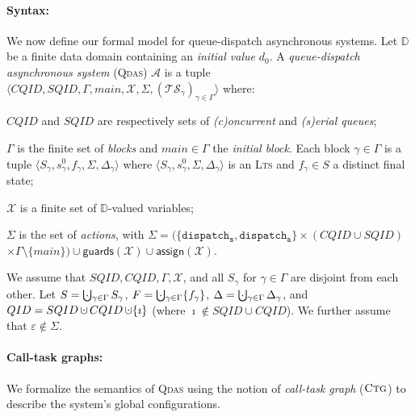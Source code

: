 \documentclass[runningheads,oribibl,]{article}
\newcommand{\tuple}[1]{\langle#1\rangle\xspace}
\newcommand{\Aa}{\ensuremath{\mathcal{A}}\xspace}
\newcommand{\Ts}{\ensuremath{\mathcal{TS}}\xspace}
\newcommand{\Xx}{\ensuremath{\mathcal{X}}\xspace}
\newcommand{\e}{\ensuremath{\varepsilon}\xspace}
\newcommand{\DD}{\ensuremath{\mathbb{D}}\xspace}
\newcommand{\cfont}[1]{\ensuremath{\mathtt{#1}}\xspace}
\DeclareMathOperator{\dotcup}{\mathaccent\cdot\cup}
\DeclareMathOperator{\bigdotcup}{\ooalign{$\bigcup$\cr\hfill$\cdot$\hfill}}
\newcommand{\CQID}{CQID\xspace}
\newcommand{\SQID}{SQID\xspace}
\newcommand{\QID}{QID\xspace}
\newcommand{\lts}{\textsc{Lts}\xspace}
\newcommand{\qdas}{\textsc{Qdas}\xspace}
\newcommand{\ctg}{\ensuremath{\textsc{Ctg}}\xspace}
\newcommand{\disps}{\ensuremath{\cfont{dispatch_s}}}
\newcommand{\dispa}{\ensuremath{\cfont{dispatch_a}}}
\newcommand{\guardson}[1]{\ensuremath{\mathsf{guards}\left(#1\right)}}
\newcommand{\assignon}[1]{\ensuremath{\mathsf{assign}\left(#1\right)}}
\newenvironment{myitemize}{\begin{list}{\labelitemi}{\setlength{\topsep}{4pt}\setlength{\partopsep}{0pt}
\setlength{\itemsep}{0pt}
\setlength{\itemindent}{0ex}
\setlength{\listparindent}{0ex}
\setlength{\leftmargin}{4ex}\setlength{\labelwidth}{2ex}
}}
{\end{list}}
\begin{document}
\paragraph{\bf Syntax:} We now define our formal model for
queue-dispatch asynchronous systems.
Let $\DD$ be a finite data domain containing an \emph{initial value}
$d_0$. A \emph{queue-dispatch asynchronous system} (\qdas) $\Aa$ is
a tuple $\tuple{ \CQID, \SQID, \Gamma, main, \Xx, \Sigma,
  (\Ts_\gamma)_{\gamma\in\Gamma}}$ where:
\begin{myitemize}
  \item $\CQID$ and $\SQID$ are respectively sets of
    \emph{(c)oncurrent} and \emph{(s)erial queues};
  \item $\Gamma$ is the finite set of \emph{blocks} and
    $main\in\Gamma$ the \emph{initial block}.  Each block
    $\gamma\in\Gamma$ is a tuple $\langle S_\gamma, s^0_\gamma,
    f_\gamma, \Sigma, \Delta_\gamma \rangle$ where $\langle S_\gamma,
    s^0_\gamma, \Sigma, \Delta_\gamma\rangle$ is an \lts and
    $f_\gamma\in S$ a distinct final state;
  \item $\Xx$ is a finite set of $\DD$-valued variables;
  \item $\Sigma$ is the set of \emph{actions}, with
    $\Sigma=(\{\disps,\dispa\}\times (\CQID\cup\SQID)$\linebreak[1] $\times
    \Gamma\setminus\{main\}) \cup \guardson{\Xx} \cup \assignon{\Xx}$.
\end{myitemize}

We assume that $\SQID, \CQID, \Gamma, \Xx$, and all $S_\gamma$ for
$\gamma\in\Gamma$ are disjoint from each other. Let
$S=\bigdotcup_{\gamma\in\Gamma}S_\gamma$,
$F=\bigdotcup_{\gamma\in\Gamma} \{f_\gamma\}$,
$\Delta=\bigdotcup_{\gamma\in\Gamma}\Delta_\gamma$, and
$\QID=\SQID\dotcup\CQID\dotcup\{\imath\}$ (where $\imath\notin\SQID\cup\CQID$).
We further assume that $\e\notin\Sigma$.

\paragraph{\bf Call-task graphs:}
We formalize the semantics of \qdas using the notion of
\emph{call-task graph} (\ctg) to describe the system's global
configurations.
\end{document}
